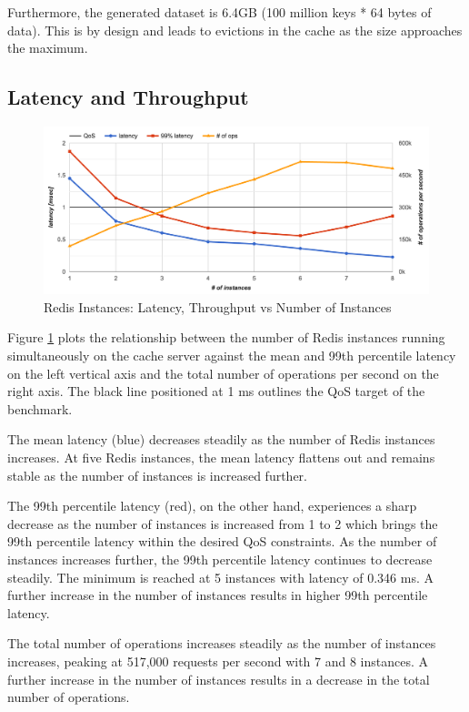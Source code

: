 Furthermore, the generated dataset is 6.4GB (100 million keys * 64 bytes of data). This is by design and leads to evictions in the cache as the size approaches the maximum.


\subsection{Latency and Throughput}

\begin{figure}[h]
    \includegraphics[width=\textwidth]{./res2/r_instances_latency.png}
    \caption{Redis Instances: Latency, Throughput vs Number of Instances}
    \label{fig:r_instances_latency}
\end{figure}

Figure \ref{fig:r_instances_latency} plots the relationship between the number of Redis instances running simultaneously on the cache server against the mean and 99th percentile latency on the left vertical axis and the total number of operations per second on the right axis. The black line positioned at 1 ms outlines the QoS target of the benchmark.

The mean latency (blue) decreases steadily as the number of Redis instances increases. At five Redis instances, the mean latency flattens out and remains stable as the number of instances is increased further.

The 99th percentile latency (red), on the other hand, experiences a sharp decrease as the number of instances is increased from 1 to 2 which brings the 99th percentile latency within the desired QoS constraints. As the number of instances increases further, the 99th percentile latency continues to decrease steadily. The minimum is reached at 5 instances with latency of 0.346 ms. A further increase in the number of instances results in higher 99th percentile latency.

The total number of operations increases steadily as the number of instances increases, peaking at 517,000 requests per second with 7 and 8 instances. A further increase in the number of instances results in a decrease in the total number of operations.

